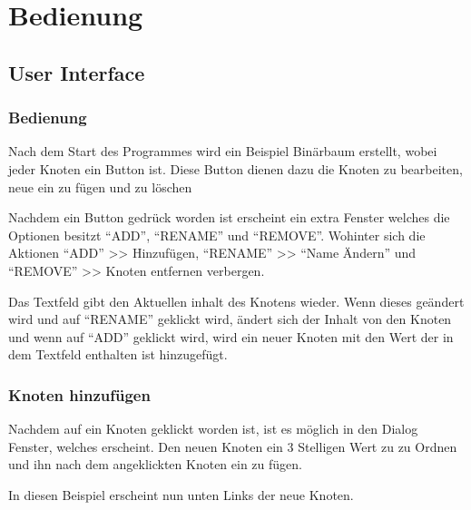 \documentclass[letterpaper,10pt,ngerman]{sphinxmanual}
\begin{document}
\chapter{Bedienung}
\label{\detokenize{index:bedienung}}

\section{User Interface}
\label{\detokenize{interface::doc}}\label{\detokenize{interface:user-interface}}

\subsection{Bedienung}
\label{\detokenize{interface:bedienung}}
Nach dem Start des Programmes wird ein Beispiel Binärbaum erstellt, wobei jeder Knoten ein Button ist.
Diese Button dienen dazu die Knoten zu bearbeiten, neue ein zu fügen und zu löschen

\noindent{}

Nachdem ein Button gedrück worden ist erscheint ein extra Fenster welches die Optionen besitzt ``ADD'',
``RENAME'' und ``REMOVE''. Wohinter sich die Aktionen ``ADD'' \textgreater{}\textgreater{} Hinzufügen, ``RENAME'' \textgreater{}\textgreater{} ``Name Ändern'' und ``REMOVE'' \textgreater{}\textgreater{}
Knoten entfernen verbergen.

Das Textfeld gibt den Aktuellen inhalt des Knotens wieder. Wenn dieses geändert wird und auf ``RENAME'' geklickt wird,
ändert sich der Inhalt von den Knoten und wenn auf ``ADD'' geklickt wird, wird ein neuer Knoten mit den Wert der in dem
Textfeld enthalten ist hinzugefügt.

\noindent{}


\subsection{Knoten hinzufügen}
\label{\detokenize{interface:knoten-hinzufugen}}
Nachdem auf ein Knoten geklickt worden ist, ist es möglich in den Dialog Fenster, welches erscheint.
Den neuen Knoten ein 3 Stelligen Wert zu zu Ordnen und ihn nach dem angeklickten Knoten ein zu fügen.

\noindent{}

In diesen Beispiel erscheint nun unten Links der neue Knoten.
\end{document}
